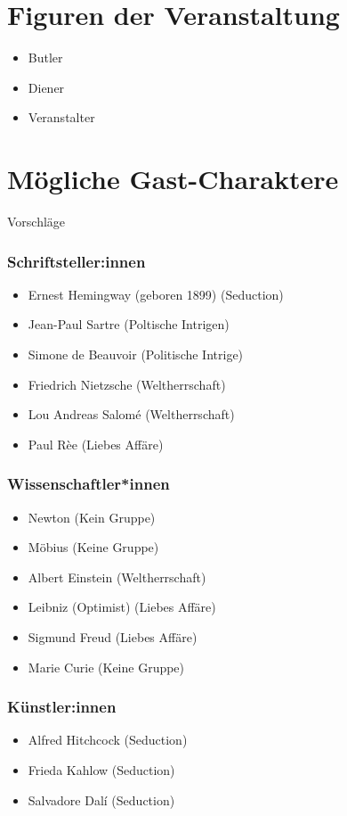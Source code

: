 \documentclass[12pt, a4paper, openany]{report}
\begin{document}
\section{Figuren der Veranstaltung}
\begin{itemize}
   	 \item Butler
    	\item Diener
    	\item Veranstalter
\end{itemize}

\section{Mögliche Gast-Charaktere}
Vorschläge 
\subsubsection{Schriftsteller:innen}
\begin{itemize}
    	\item Ernest Hemingway (geboren 1899) (Seduction)
    	\item Jean-Paul Sartre (Poltische Intrigen)
    	\item Simone de Beauvoir (Politische Intrige)
    	\item Friedrich Nietzsche (Weltherrschaft)
    	\item Lou Andreas Salomé (Weltherrschaft)
    	\item Paul Rèe (Liebes Affäre)
\end{itemize}

\subsubsection{Wissenschaftler*innen}
\begin{itemize}
    	\item Newton (Kein Gruppe) 
    	\item Möbius (Keine Gruppe)
    	\item Albert Einstein (Weltherrschaft)
	\item Leibniz (Optimist) (Liebes Affäre)
	\item Sigmund Freud (Liebes Affäre)
	\item Marie Curie (Keine Gruppe)
\end{itemize}

\subsubsection{Künstler:innen}
\begin{itemize}
	\item Alfred Hitchcock (Seduction)
	\item Frieda Kahlow (Seduction)
	\item Salvadore Dalí (Seduction)
\end{itemize}
\end{document}
